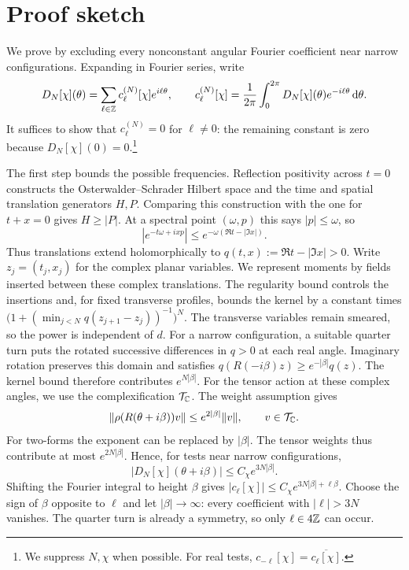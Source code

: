 \section{Proof sketch}\label{sec:sketch}

We prove  by excluding every nonconstant angular
Fourier coefficient near narrow configurations. Expanding in Fourier
series, write
\begin{equation}\label{eq:fourier_integral}
 D_N[\chi](\theta)=\sum_{\ell\in\mathbb{Z}}c_\ell^{(N)}[\chi]e^{i\ell\theta},
 \qquad c_\ell^{(N)}[\chi]=\frac1{2\pi}\int_0^{2\pi}
 D_N[\chi](\theta)e^{-i\ell\theta}\,\mathrm{d}\theta.
\end{equation}
It suffices to show that $c_\ell^{(N)}=0$ for $\ell\neq0$: the
remaining constant is zero because $D_N[\chi](0)=0$.\footnote{We
suppress $N,\chi$ when possible. For real tests,
$c_{-\ell}[\chi]=\overline{c_\ell[\chi]}$.}

The first step bounds the possible frequencies. Reflection positivity
across $t=0$ constructs the Osterwalder--Schrader Hilbert space and
the time and spatial translation generators $H,P$. Comparing this
construction with the one for $t+x=0$ gives $H\geq|P|$. At a spectral
point $(\omega,p)$ this says $|p|\leq\omega$, so
\[
 |e^{-t\omega+ixp}|\leq
 e^{-\omega(\Re t-|\Im x|)}.
\]
Thus translations extend holomorphically to
$q(t,x):=\Re t-|\Im x|>0$. Write $z_j=(t_j,x_j)$ for the complex
planar variables. We represent moments by fields inserted between
these complex translations. The regularity bound controls the
insertions and, for fixed transverse profiles, bounds the kernel by
a constant times $\bigl(1+(\min_{j<N}q(z_{j+1}-z_j))^{-1}\bigr)^N$.
The transverse variables remain smeared, so the power is independent of $d$.
For a narrow configuration, a suitable quarter turn puts the rotated
successive differences in $q>0$ at each real angle. Imaginary rotation
preserves this domain and satisfies
$q(R(-i\beta)z)\geq e^{-|\beta|}q(z)$. The kernel bound therefore
contributes $e^{N|\beta|}$. For the tensor action at these complex
angles, we use the complexification $\mathcal{T}_{\mathbb{C}}$. The weight assumption
gives
\begin{equation}\label{eq:tensor-growth}
 \|\rho(R(\theta+i\beta))v\|\leq e^{2|\beta|}\|v\|,
 \qquad v\in\mathcal{T}_{\mathbb{C}}.
\end{equation}
For two-forms the exponent can be replaced by $|\beta|$.
The tensor weights thus contribute at most $e^{2N|\beta|}$.
Hence, for tests near narrow configurations,
\begin{equation}\label{eq:angular-growth-preview}
 |D_N[\chi](\theta+i\beta)|\leq C_\chi e^{3N|\beta|}.
\end{equation}
Shifting the Fourier integral to height $\beta$ gives
$|c_\ell[\chi]|\leq C_\chi e^{3N|\beta|+\ell\beta}$.
Choose the sign of $\beta$ opposite to $\ell$ and let
$|\beta|\to\infty$: every coefficient with $|\ell|>3N$ vanishes.
The quarter turn is already a symmetry, so only $\ell\in4\mathbb{Z}$
can occur.

